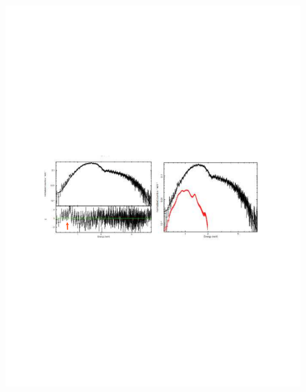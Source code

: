 \documentclass[11pt,a4paper]{article}
\begin{document}
{\begin{figure}[h]
\begin{center}
  \vspace{0.25in}
\includegraphics[width=5.5in,clip,trim=80 310 88 320]{RXJ1713_spectra1}

\end{center}
\end{figure}}
\end{document}
